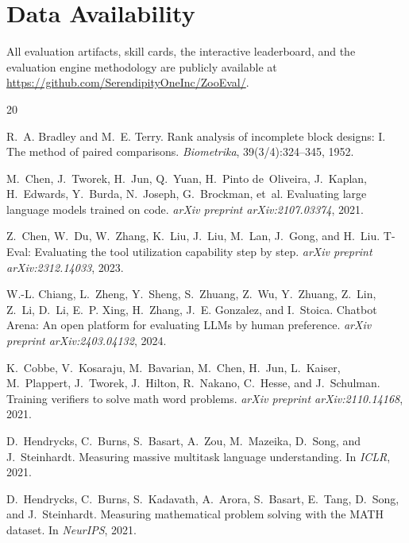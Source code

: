 \documentclass[11pt,a4paper]{article}
\begin{document}
\section*{Data Availability}

All evaluation artifacts, skill cards, the interactive leaderboard, and the evaluation engine methodology are publicly available at \url{https://github.com/SerendipityOneInc/ZooEval/}. 

\begin{thebibliography}{20}

R.~A. Bradley and M.~E. Terry.
\newblock Rank analysis of incomplete block designs: I. The method of paired comparisons.
\newblock \emph{Biometrika}, 39(3/4):324--345, 1952.

M.~Chen, J.~Tworek, H.~Jun, Q.~Yuan, H.~Pinto de~Oliveira, J.~Kaplan, H.~Edwards, Y.~Burda, N.~Joseph, G.~Brockman, et~al.
\newblock Evaluating large language models trained on code.
\newblock \emph{arXiv preprint arXiv:2107.03374}, 2021.

Z.~Chen, W.~Du, W.~Zhang, K.~Liu, J.~Liu, M.~Lan, J.~Gong, and H.~Liu.
\newblock T-Eval: Evaluating the tool utilization capability step by step.
\newblock \emph{arXiv preprint arXiv:2312.14033}, 2023.

W.-L. Chiang, L.~Zheng, Y.~Sheng, S.~Zhuang, Z.~Wu, Y.~Zhuang, Z.~Lin, Z.~Li, D.~Li, E.~P. Xing, H.~Zhang, J.~E. Gonzalez, and I.~Stoica.
\newblock Chatbot Arena: An open platform for evaluating LLMs by human preference.
\newblock \emph{arXiv preprint arXiv:2403.04132}, 2024.

K.~Cobbe, V.~Kosaraju, M.~Bavarian, M.~Chen, H.~Jun, L.~Kaiser, M.~Plappert, J.~Tworek, J.~Hilton, R.~Nakano, C.~Hesse, and J.~Schulman.
\newblock Training verifiers to solve math word problems.
\newblock \emph{arXiv preprint arXiv:2110.14168}, 2021.

D.~Hendrycks, C.~Burns, S.~Basart, A.~Zou, M.~Mazeika, D.~Song, and J.~Steinhardt.
\newblock Measuring massive multitask language understanding.
\newblock In \emph{ICLR}, 2021{}.

D.~Hendrycks, C.~Burns, S.~Kadavath, A.~Arora, S.~Basart, E.~Tang, D.~Song, and J.~Steinhardt.
\newblock Measuring mathematical problem solving with the MATH dataset.
\newblock In \emph{NeurIPS}, 2021{}.


\end{thebibliography}
\end{document}
